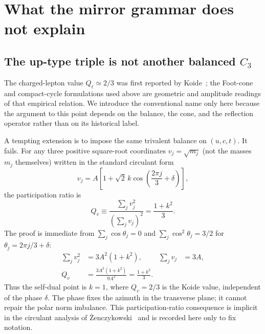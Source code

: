 \documentclass[aps,twocolumn,superscriptaddress,nofootinbib,floatfix]{revtex4-2}
\begin{document}
\section{What the mirror grammar does not explain}
\label{sec:failures}

\subsection{The up-type triple is not another balanced $C_3$}

The charged-lepton value $Q_\ell\simeq2/3$ was first reported by Koide~\cite{Koide1983}; the Foot-cone and compact-cycle formulations used above are geometric and amplitude readings of that empirical relation. We introduce the conventional name only here because the argument to this point depends on the balance, the cone, and the reflection operator rather than on its historical label.

A tempting extension is to impose the same trivalent balance on $(u,c,t)$. It fails. For any three positive square-root coordinates $v_j=\sqrt{m_j}$ (not the masses $m_j$ themselves) written in the standard circulant form~\cite{Koide1983,Zenczykowski2012}
\begin{equation}
v_j=A\left[1+\sqrt2\,k\cos\left(\frac{2\pi j}{3}+\delta\right)\right],
\end{equation}
the participation ratio is
\begin{equation}
Q_v\equiv\frac{\sum_jv_j^2}{(\sum_jv_j)^2}=\frac{1+k^2}{3}.
\label{eq:Qk}
\end{equation}
The proof is immediate from $\sum_j\cos\theta_j=0$ and $\sum_j\cos^2\theta_j=3/2$ for $\theta_j=2\pi j/3+\delta$:
\begin{align}
\sum_j v_j^2&=3A^2(1+k^2),
&
\sum_j v_j&=3A,
\nonumber\\
Q_v&=\frac{3A^2(1+k^2)}{9A^2}
=\frac{1+k^2}{3}.
\end{align}
Thus the self-dual point is $k=1$, where $Q_v=2/3$ is the Koide value, independent of the phase $\delta$. The phase fixes the azimuth in the transverse plane; it cannot repair the polar norm imbalance. This participation-ratio consequence is implicit in the circulant analysis of \.{Z}enczykowski~\cite{Zenczykowski2012} and is recorded here only to fix notation.
\end{document}
